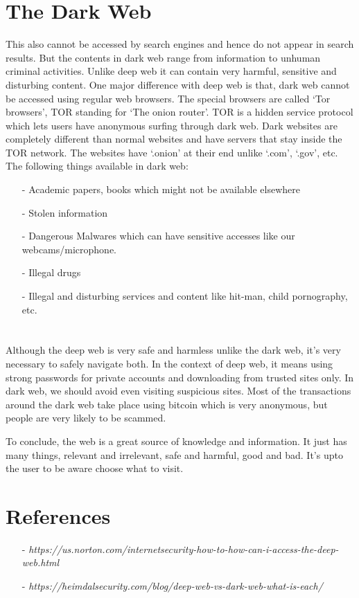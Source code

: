 \documentclass[12pt]{article}
\begin{document}
\section*{The Dark Web}
This also cannot be accessed by search engines and hence do not appear in
search results. But the contents in dark web range from information to unhuman
criminal activities. Unlike deep web it can contain very harmful, sensitive and
disturbing content. One major difference with deep web is that, dark web cannot
be accessed using regular web browsers. The special browsers are called `Tor
browsers', TOR standing for `The onion router'. TOR is a hidden service
protocol which lets users have anonymous surfing through dark web. Dark
websites are completely different than normal websites and have servers that
stay inside the TOR network. The websites have `.onion' at their end unlike
`.com', `.gov', etc. The following things available in dark web:
\begin{itemize}
    \item [-] Academic papers, books which might not be available elsewhere
    \item [-] Stolen information
    \item [-] Dangerous Malwares which can have sensitive accesses like our webcams/microphone.
    \item [-] Illegal drugs
    \item [-] Illegal and disturbing services and content like hit-man, child pornography, etc.
\end{itemize}

\section*{}
Although the deep web is very safe and harmless unlike the dark web, it's very
necessary to safely navigate both. In the context of deep web, it means using
strong passwords for private accounts and downloading from trusted sites only.
In dark web, we should avoid even visiting suspicious sites. Most of the
transactions around the dark web take place using bitcoin which is very
anonymous, but people are very likely to be scammed.

To conclude, the web is a great source of knowledge and information. It just
has many things, relevant and irrelevant, safe and harmful, good and bad. It's
upto the user to be aware choose what to visit.

\section*{References}
\begin{itemize}
    \item[-] \textit{https://us.norton.com/internetsecurity-how-to-how-can-i-access-the-deep-web.html}
    \item[-] \textit{https://heimdalsecurity.com/blog/deep-web-vs-dark-web-what-is-each/}
\end{itemize}
\end{document}
